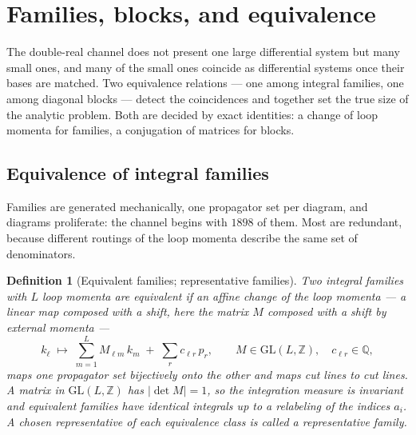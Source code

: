 \documentclass[11pt]{article}
\newcommand{\Q}{\mathbb{Q}}
\newcommand{\Z}{\mathbb{Z}}
\newtheorem{definition}{Definition}[section]
\begin{document}
\section{Families, blocks, and equivalence}
\label{sec:classes}

The double-real channel does not present one large differential
system but many small ones, and many of the small ones coincide as
differential systems once their bases are matched.  Two equivalence
relations --- one among integral families, one among diagonal blocks
--- detect the coincidences and together set the true size of the
analytic problem.  Both are decided by exact identities: a change of
loop momenta for families, a conjugation of matrices for blocks.

\subsection{Equivalence of integral families}

Families are generated mechanically, one propagator set per diagram,
and diagrams proliferate: the channel begins with $1898$ of them.
Most are redundant, because different routings of the loop momenta
describe the same set of denominators.

\begin{definition}[Equivalent families; representative families]
\label{def:famequiv}
Two integral families with $L$ loop momenta are \emph{equivalent} if
an \emph{affine} change of the loop momenta --- a linear map composed
with a shift, here the matrix $M$ composed with a shift by external
momenta ---
\begin{equation}
  k_\ell \;\longmapsto\; \sum_{m=1}^{L} M_{\ell m}\, k_m
  \;+\; \sum_{r} c_{\ell r}\, p_r ,
  \qquad M \in \mathrm{GL}(L,\Z),\quad c_{\ell r} \in \Q ,
  \label{eq:shift}
\end{equation}
maps one propagator set bijectively onto the other and maps cut
lines to cut lines.  A matrix in $\mathrm{GL}(L,\Z)$ has
$\lvert\det M\rvert = 1$, so the integration measure is invariant and
equivalent families have identical integrals up to a relabeling of
the indices $a_i$.  A chosen representative of each equivalence class
is called a \emph{representative family}.
\end{definition}
\end{document}
